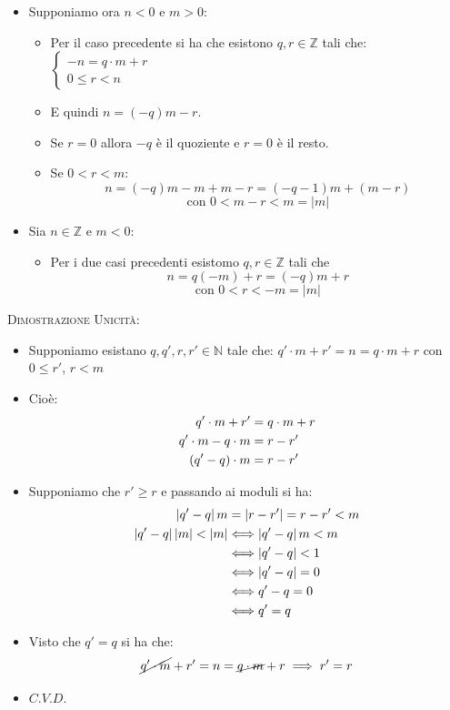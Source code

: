 \documentclass[10pt]{article}
\begin{document}
\begin{itemize}
\begin{itemize}
\end{itemize}
\item
Supponiamo ora $n < 0$ e $m > 0$:
\begin{itemize}
\item
Per il caso precedente si ha che esistono $q,r \in \mathbb{Z}$ tali che: $\begin{cases} -n = q \cdot m + r \\ 0 \leq r < n \end{cases}$
\item
E quindi $n= (-q)m - r$.
\item
Se $r = 0$ allora $-q$ è il quoziente e $r=0$ è il resto.
\item
Se $0<r<m$:
$$n = (-q)m - m + m - r = (-q -1)m + (m-r)$$
$$\textrm{con } 0<m-r<m = |m|$$
\end{itemize}
\item
Sia $n \in \mathbb{Z}$ e $m < 0$:
\begin{itemize}
\item
Per i due casi precedenti esistomo $q,r \in \mathbb{Z}$ tali che 
$$n = q(-m) + r = (-q)m + r$$
$$\textrm{con } 0<r<-m = |m|$$
\end{itemize}
\end{itemize}
\textsc{Dimostrazione Unicità:}
\begin{itemize}
\item
Supponiamo esistano $q, q', r, r' \in \mathbb{N}$ tale che: $q' \cdot m + r' = n = q \cdot m + r $ con $0 \leq r'$, $r<m$
\item
Cioè:
\begin{equation}
\begin{split}
q' \cdot m + r' &= q \cdot m + r \\
q' \cdot m - q \cdot m &= r - r' \\
(q' - q) \cdot m &= r - r'
\notag
\end{split}
\end{equation}
\item
Supponiamo che $r' \geq r$ e passando ai moduli si ha:
\begin{equation}
\begin{split}
 |q' - q| \, m &= |r-r'| = r-r' < m \\
 |q' - q| \, |m| < |m| & \Longleftrightarrow |q' - q| \, m < m \\
 & \Longleftrightarrow |q' - q| < 1 \\
 & \Longleftrightarrow |q' - q| = 0 \\
 & \Longleftrightarrow q' - q = 0 \\
 & \Longleftrightarrow q' = q 
 \notag
\end{split}
\end{equation}
\item
Visto che $q' = q$ si ha che: $$\cancel{q' \cdot m} + r' = n = \cancel{q \cdot m} + r \implies r' = r$$
\item
$C.V.D.$
\end{itemize}
\end{document}
